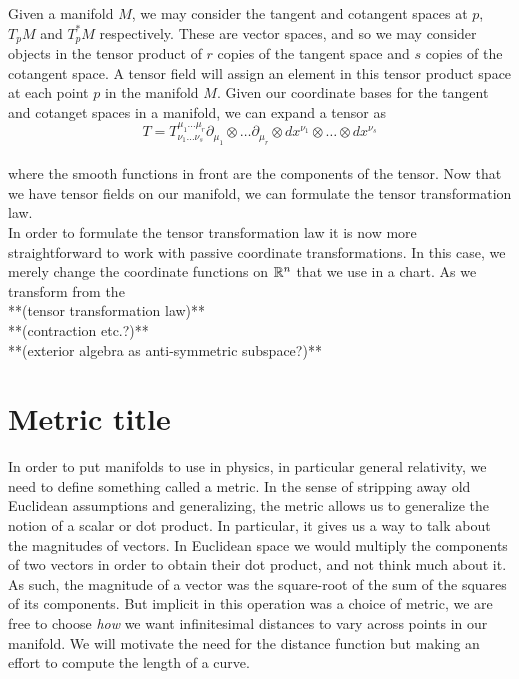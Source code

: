     Given a manifold $M$, we may consider the tangent and cotangent spaces at $p$, $T_pM$ and $T^*_pM$ respectively.  These are vector spaces, and so we may consider objects in the tensor product of $r$ copies of the tangent space and $s$ copies of the cotangent space.  A tensor field will assign an element in this tensor product space at each point $p$ in the manifold $M$.  Given our coordinate bases for the tangent and cotanget spaces in a manifold, we can expand a tensor as
    \begin{equation*}
    	T = T^{\mu_1\dots \mu_r}_{\nu_1 \dots \nu_s}\partial_{\mu_1}\otimes \dots \partial_{\mu_r}\otimes dx^{\nu_1}\otimes \dots \otimes dx^{\nu_s}
    \end{equation*} \\
    where the smooth functions in front are the components of the tensor.  Now that we have tensor fields on our manifold, we can formulate the tensor transformation law.\\
    
    In order to formulate the tensor transformation law it is now more straightforward to work with passive coordinate transformations.  In this case, we merely change the coordinate functions on $\mathbb{R}^n$ that we use in a chart.  As we transform from the \\
    
    **(tensor transformation law)**\\
    
**(contraction etc.?)**\\

**(exterior algebra as anti-symmetric subspace?)**\\
\section*{Metric title}
In order to put manifolds to use in physics, in particular general relativity, we need to define something called a metric. In the sense of stripping away old Euclidean assumptions and generalizing, the metric allows us to generalize the notion of a scalar or dot product.  In particular, it gives us a way to talk about the magnitudes of vectors.  In Euclidean space we would multiply the components of two vectors in order to obtain their dot product, and not think much about it.  As such, the magnitude of a vector was the square-root of the sum of the squares of its components.  But implicit in this operation was a choice of metric, we are free to choose \textit{how} we want infinitesimal distances to vary across points in our manifold.  We will motivate the need for the distance function but making an effort to compute the length of a curve.\\

